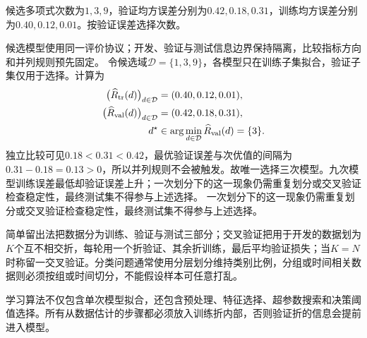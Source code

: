 \label{struct:V1-C10-CH32}
\begin{example}[验证误差选择多项式次数]\label{exm:V1-C10-model-selection}
候选多项式次数为$1,3,9$，验证均方误差分别为$0.42,0.18,0.31$，训练均方误差分别为$0.40,0.12,0.01$。按验证误差选择次数。
\end{example}
\label{struct:V1-C10-CH33}
\begin{solution}
\SolGiven 候选模型使用同一评价协议；开发、验证与测试信息边界保持隔离，比较指标方向和并列规则预先固定。
\SolDerive
令候选域$\mathcal D=\{1,3,9\}$，各模型只在训练子集拟合，验证子集仅用于选择。计算为
\[
\begin{aligned}
\bigl(\widehat R_{\rm tr}(d)\bigr)_{d\in\mathcal D}
  &=(0.40,0.12,0.01),\\
\bigl(\widehat R_{\rm val}(d)\bigr)_{d\in\mathcal D}
  &=(0.42,0.18,0.31),\\
d^\star
  &\in\arg\min_{d\in\mathcal D}\widehat R_{\rm val}(d)=\{3\}.
\end{aligned}
\]
独立比较可见$0.18<0.31<0.42$，最优验证误差与次优值的间隔为$0.31-0.18=0.13>0$，所以并列规则不会被触发。故唯一选择三次模型。九次模型训练误差最低却验证误差上升；一次划分下的这一现象仍需重复划分或交叉验证检查稳定性，最终测试集不得参与上述选择。
\SolAnswer 一次划分下的这一现象仍需重复划分或交叉验证检查稳定性，最终测试集不得参与上述选择。
\end{solution}


简单留出法把数据分为训练、验证与测试三部分；\kFold{}交叉验证把用于开发的数据划为$K$个互不相交折，每轮用一个折验证、其余折训练，最后平均验证损失；当$K=N$时称留一交叉验证。分类问题通常使用分层划分维持类别比例，分组或时间相关数据则必须按组或时间切分，不能假设样本可任意打乱。

\label{struct:V1-C10-CH10}
学习算法不仅包含单次模型拟合，还包含预处理、特征选择、超参数搜索和决策阈值选择。所有从数据估计的步骤都必须放入训练折内部，否则验证折的信息会提前进入模型。



\label{struct:V1-C10-CH19}
\label{struct:V1-C10-CH20}
\label{struct:V1-C10-CH21}
